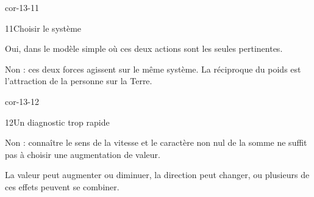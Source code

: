 \begin{blocLivre}{cor-13-11}\begin{corrige}{11}{Choisir le système}
\begin{questions}
\item Oui, dans le modèle simple où ces deux actions sont les seules pertinentes.
\item Non : ces deux forces agissent sur le même système. La réciproque du poids est l’attraction de la personne sur la Terre.
\end{questions}
\end{corrige}\end{blocLivre}
\begin{blocLivre}{cor-13-12}\begin{corrige}{12}{Un diagnostic trop rapide}
\begin{questions}
\item Non : connaître le sens de la vitesse et le caractère non nul de la somme ne suffit pas à choisir une augmentation de valeur.
\item La valeur peut augmenter ou diminuer, la direction peut changer, ou plusieurs de ces effets peuvent se combiner.
\end{questions}
\end{corrige}\end{blocLivre}

